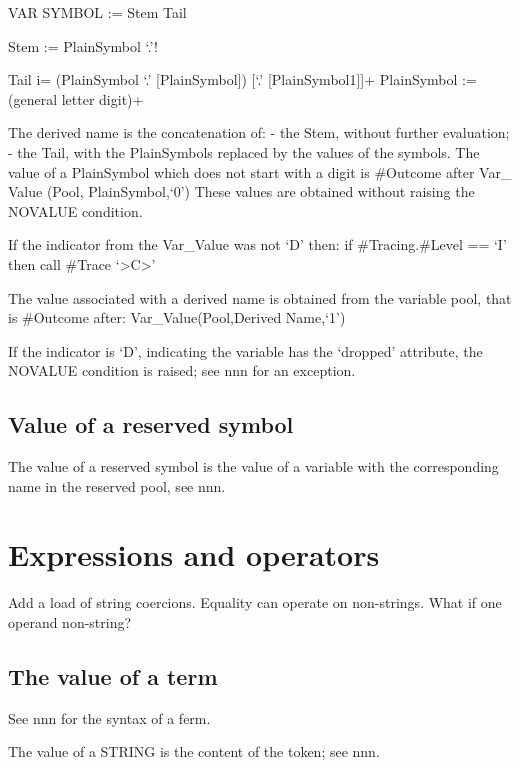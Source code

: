 VAR SYMBOL := Stem Tail

Stem := PlainSymbol `.'!

Tail i= (PlainSymbol \textbar{} `.' {[}PlainSymbol{]}) {[}`.'
{[}PlainSymbol1{]}{]}+ PlainSymbol := (general letter \textbar{} digit)+

The derived name is the concatenation of: - the Stem, without further
evaluation; - the Tail, with the PlainSymbols replaced by the values of
the symbols. The value of a PlainSymbol which does not start with a
digit is \#Outcome after Var\_ Value (Pool, PlainSymbol,`0') These
values are obtained without raising the NOVALUE condition.

If the indicator from the Var\_Value was not `D' then: if
\#Tracing.\#Level == `I' then call \#Trace
`\textgreater C\textgreater{}'

The value associated with a derived name is obtained from the variable
pool, that is \#Outcome after: Var\_Value(Pool,Derived Name,`1')

If the indicator is `D', indicating the variable has the `dropped'
attribute, the NOVALUE condition is raised; see nnn for an exception.

\hypertarget{value-of-a-reserved-symbol}{%
\subsection{Value of a reserved
symbol}\label{value-of-a-reserved-symbol}}

The value of a reserved symbol is the value of a variable with the
corresponding name in the reserved pool, see nnn.

\hypertarget{expressions-and-operators}{%
\section{Expressions and operators}\label{expressions-and-operators}}

Add a load of string coercions. Equality can operate on non-strings.
What if one operand non-string?

\hypertarget{the-value-of-a-term}{%
\subsection{The value of a term}\label{the-value-of-a-term}}

See nnn for the syntax of a ferm.

The value of a STRING is the content of the token; see nnn.

